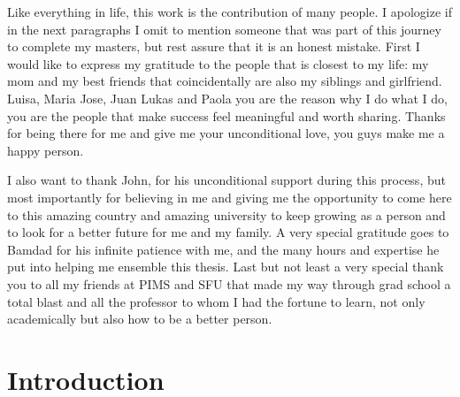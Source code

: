 \documentclass{sfuthesis}
\begin{document}
\begin{acknowledgements}
Like everything in life, this work is the contribution of many people. I apologize if in the next paragraphs
I omit to mention someone that was part of this journey to complete my masters, but rest assure that it is an honest
mistake. First I would like to express my gratitude to the people that is closest to my life: my mom and my best friends 
that coincidentally are also my siblings and girlfriend. Luisa, Maria Jose, Juan Lukas and Paola you are the reason why I
do what I do, you are the people that make success feel meaningful and worth sharing. Thanks for being there for
me and give me your unconditional love, you guys make me a happy person. 


I also want to thank John,
for his unconditional support during this process, but most importantly for 
believing in me and giving me the opportunity 
to come here to this amazing country and amazing university to keep growing as a person and to look for
a better future for me and my family. A very special gratitude goes to Bamdad for his infinite patience
with me, and the many hours and expertise he put into helping me ensemble this thesis. Last but not least
a very special thank you to all my friends at PIMS and SFU that made my way through grad school  a total blast 
and all the professor to whom I had the fortune to learn, not only academically but also how to be a better
person.

\end{acknowledgements}

%
\tableofcontents%
\clearpage

%
\listoftables%
\clearpage

%
\listoffigures%
\clearpage





%
%

\mainmatter%

\chapter{Introduction}

\end{document}
